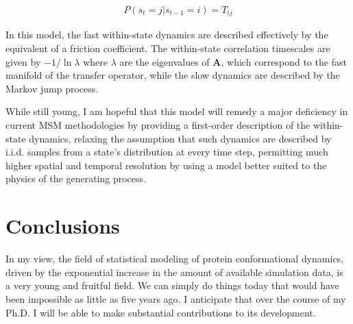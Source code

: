 \documentclass[twocolumn,floatfix,nofootinbib,aps]{revtex4-1}
\begin{document}
\begin{align}
P(s_t = j | s_{t-1} = i) = T_{ij}
\end{align}

In this model, the fast within-state dynamics are described effectively by the equivalent of a friction coefficient. The within-state correlation timescales are given by $-1/\ln \lambda$ where $\lambda$ are the eigenvalues of $\mathbf{A}$, which correspond to the fast manifold of the transfer operator\cite{Prinz2011Markov}, while the slow dynamics are described by the Markov jump process.

While still young, I am hopeful that this model will remedy a major deficiency in current MSM methodologies by providing a first-order description of the within-state dynamics, relaxing the assumption that such dynamics are described by i.i.d. samples from a state's distribution at every time step, permitting much higher spatial and temporal resolution by using a model better suited to the physics of the generating process.

\section{Conclusions}

In my view, the field of statistical modeling of protein conformational dynamics, driven by the exponential increase in the amount of available simulation data, is a very young and fruitful field. We can simply do things today that would have been impossible as little as five years ago. I anticipate that over the course of my Ph.D. I will be able to make substantial contributions to its development.



\end{document}
